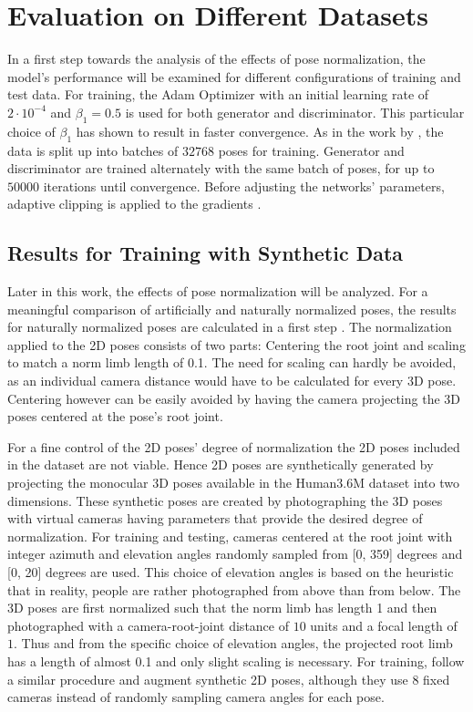 \section{
	Evaluation on Different Datasets}
\label{sec:evaluation}

In a first step towards the analysis of the effects of pose normalization, the model's performance will be examined for different configurations of training and test data.
For training, the Adam Optimizer \cite{kingma17} with an initial learning rate of $2 \cdot 10^{-4}$ and $\beta_1 = 0.5$ is used for both generator and discriminator.
This particular choice of $\beta_1$ has shown to result in faster convergence.
As in the work by \citet{drover18}, the data is split up into batches of $32768$ poses for training.
Generator and discriminator are trained alternately with the same batch of poses, for up to $50000$ iterations until convergence.
Before adjusting the networks' parameters, adaptive clipping is applied to the gradients \cite[Section~3.2.1]{chorowski14}.


\subsection{Results for Training with Synthetic Data}

Later in this work, the effects of pose normalization will be analyzed.
For a meaningful comparison of artificially and naturally normalized poses, the results for naturally normalized poses are calculated in a first step .
The normalization applied to the 2D poses consists of two parts: Centering the root joint and scaling to match a norm limb length of 0.1.
The need for scaling can hardly be avoided, as an individual camera distance would have to be calculated for every 3D pose.
Centering however can be easily avoided by having the camera projecting the 3D poses centered at the pose's root joint.

For a fine control of the 2D poses' degree of normalization the 2D poses included in the dataset are not viable.
Hence 2D poses are synthetically generated by projecting the monocular 3D poses available in the Human3.6M dataset into two dimensions.
These synthetic poses are created by photographing the 3D poses with virtual cameras having parameters that provide the desired degree of normalization.
For training and testing, cameras centered at the root joint with integer azimuth and elevation angles randomly sampled from [0, 359] degrees and [0, 20] degrees are used.
This choice of elevation angles is based on the heuristic that in reality, people are rather photographed from above than from below.
The 3D poses are first normalized such that the norm limb has length 1 and then photographed with a camera-root-joint distance of $10$ units and a focal length of $1$.
Thus and from the specific choice of elevation angles, the projected root limb has a length of almost 0.1 and only slight scaling is necessary.
For training, \citet{drover18} follow a similar procedure and augment synthetic 2D poses, although they use 8 fixed cameras instead of randomly sampling camera angles for each pose.

